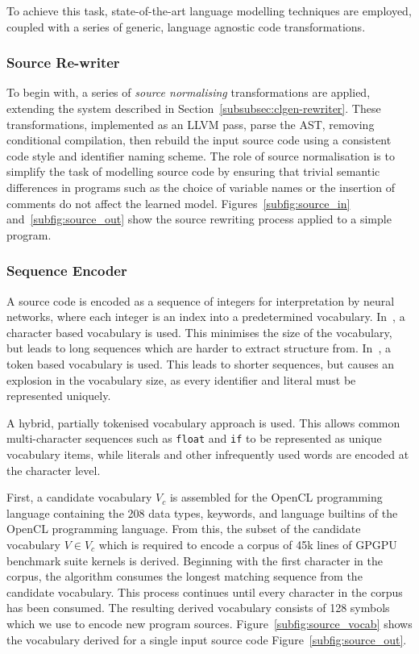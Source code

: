 To achieve this task, state-of-the-art language modelling techniques are employed, coupled with a series of generic, language agnostic code transformations.

\subsubsection{Source Re-writer}

To begin with, a series of \emph{source normalising} transformations are applied, extending the system described in Section~\ref{subsubsec:clgen-rewriter}. These transformations, implemented as an LLVM pass, parse the AST, removing conditional compilation, then rebuild the input source code using a consistent code style and identifier naming scheme. The role of source normalisation is to simplify the task of modelling source code by ensuring that trivial semantic differences in programs such as the choice of variable names or the insertion of comments do not affect the learned model. Figures~\ref{subfig:source_in} and~\ref{subfig:source_out} show the source rewriting process applied to a simple program.

\subsubsection{Sequence Encoder}

A source code is encoded as a sequence of integers for interpretation by neural networks, where each integer is an index into a predetermined vocabulary. In~\cite{Jozefowicz2016a}, a character based vocabulary is used. This minimises the size of the vocabulary, but leads to long sequences which are harder to extract structure from. In~\cite{Allamanis2013a}, a token based vocabulary is used. This leads to shorter sequences, but causes an explosion in the vocabulary size, as every identifier and literal must be represented uniquely.

A hybrid, partially tokenised vocabulary approach is used. This allows common multi-character sequences such as \texttt{float} and \texttt{if} to be represented as unique vocabulary items, while literals and other infrequently used words are encoded at the character level.

First, a candidate vocabulary $V_c$ is assembled for the OpenCL programming language containing the 208 data types, keywords, and language builtins of the OpenCL programming language. From this, the subset of the candidate vocabulary $V \in V_c$ which is required to encode a corpus of 45k lines of GPGPU benchmark suite kernels is derived. Beginning with the first character in the corpus, the algorithm consumes the longest matching sequence from the candidate vocabulary. This process continues until every character in the corpus has been consumed. The resulting derived vocabulary consists of 128 symbols which we use to encode new program sources. Figure~\ref{subfig:source_vocab} shows the vocabulary derived for a single input source code Figure~\ref{subfig:source_out}.


